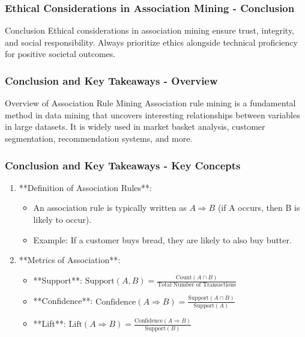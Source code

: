 \documentclass[aspectratio=169]{beamer}
\begin{document}
\begin{frame}[fragile]
    \frametitle{Ethical Considerations in Association Mining - Conclusion}
    \begin{block}{Conclusion}
        Ethical considerations in association mining ensure trust, integrity, and social responsibility. Always prioritize ethics alongside technical proficiency for positive societal outcomes.
    \end{block}
\end{frame}

\begin{frame}[fragile]
  \frametitle{Conclusion and Key Takeaways - Overview}
  \begin{block}{Overview of Association Rule Mining}
    Association rule mining is a fundamental method in data mining that uncovers interesting relationships between variables in large datasets. 
    It is widely used in market basket analysis, customer segmentation, recommendation systems, and more.
  \end{block}
\end{frame}

\begin{frame}[fragile]
  \frametitle{Conclusion and Key Takeaways - Key Concepts}
  \begin{enumerate}
    \item **Definition of Association Rules**:
      \begin{itemize}
        \item An association rule is typically written as \( A \Rightarrow B \) (if A occurs, then B is likely to occur).
        \item Example: If a customer buys bread, they are likely to also buy butter.
      \end{itemize}
      
    \item **Metrics of Association**:
      \begin{itemize}
        \item **Support**: \( \text{Support}(A, B) = \frac{\text{Count}(A \cap B)}{\text{Total Number of Transactions}} \)
        \item **Confidence**: \( \text{Confidence}(A \Rightarrow B) = \frac{\text{Support}(A \cap B)}{\text{Support}(A)} \)
        \item **Lift**: \( \text{Lift}(A \Rightarrow B) = \frac{\text{Confidence}(A \Rightarrow B)}{\text{Support}(B)} \)
      \end{itemize}
  \end{enumerate}
\end{frame}
\end{document}

